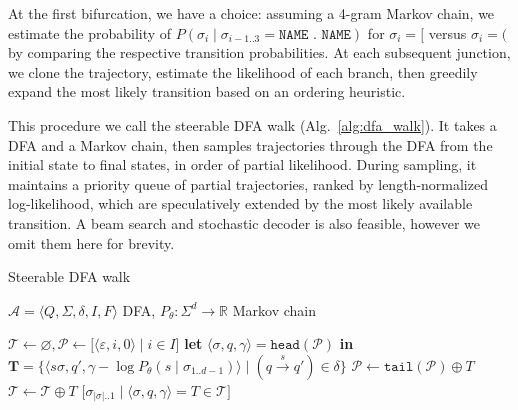 \documentclass[runningheads]{llncs}
\begin{document}
At the first bifurcation, we have a choice: assuming a 4-gram Markov chain, we estimate the probability of $P(\sigma_i \mid \sigma_{i-1..3}=\texttt{NAME . NAME})$ for $\sigma_i = \texttt{[}$ versus $\sigma_i = \texttt{(}$ by comparing the respective transition probabilities. At each subsequent junction, we clone the trajectory, estimate the likelihood of each branch, then greedily expand the most likely transition based on an ordering heuristic.

This procedure we call the steerable DFA walk (Alg.~\ref{alg:dfa_walk}). It takes a DFA and a Markov chain, then samples trajectories through the DFA from the initial state to final states, in order of partial likelihood. During sampling, it maintains a priority queue of partial trajectories, ranked by length-normalized log-likelihood, which are speculatively extended by the most likely available transition. A beam search and stochastic decoder is also feasible, however we omit them here for brevity.

\begin{algorithm}[H]
\caption{Steerable DFA walk}
\label{alg:dfa_walk}
\begin{algorithmic}[1]
\Require $\mathcal{A} = \langle Q, \Sigma, \delta, I, F\rangle$ DFA, $P_\theta: \Sigma^d \rightarrow \mathbb{R}$ Markov chain

\State $\mathcal{T} \gets \varnothing, \mathcal{P} \gets \big[\langle \varepsilon, i, 0\rangle \mid i \in I\big]$ 
\Repeat
\State \textbf{let }$\langle \sigma, q, \gamma \rangle = \texttt{head}(\mathcal{P})$ \textbf{in}
\State {}$\mathbf{T} = \big\{\langle s\sigma, q', \gamma - \log P_\theta(s \mid \sigma_{1..d-1}) \rangle\mid (q\overset{s}{\rightarrow}q') \in \delta\big\}$ 
\State $\mathcal{P} \gets \texttt{tail}(\mathcal{P}) \oplus T$ 
\EndIf
{}
\State $\mathcal{T} \gets \mathcal{T} \oplus T$ 
\EndIf
\EndFor
{}
\State \Return $\big[\sigma_{|\sigma|..1} \mid \langle \sigma, q, \gamma \rangle = T \in \mathcal{T}\big]$ 
\end{algorithmic}
\end{algorithm}\vspace{-0.2cm}
\end{document}

